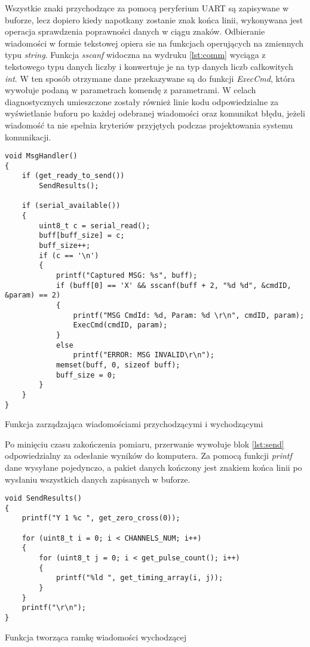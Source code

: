 Wszystkie znaki przychodzące za pomocą peryferium UART są zapisywane w buforze, lecz dopiero kiedy napotkany zostanie znak końca linii, 
wykonywana jest operacja sprawdzenia poprawności danych w ciągu znaków. 
Odbieranie wiadomości w formie tekstowej opiera sie na funkcjach operujących na zmiennych typu \textit{string}. 
Funkcja \textit{sscanf} widoczna na wydruku \ref{lst:comm}  wyciąga z tekstowego typu danych liczby i konwertuje je na typ danych liczb całkowitych \textit{int}.
W ten sposób otrzymane dane przekazywane są do funkcji \textit{ExecCmd}, która wywołuje podaną w parametrach komendę z parametrami.
W celach diagnostycznych umieszczone zostały również linie kodu odpowiedzialne za wyświetlanie buforu po każdej odebranej wiadomości oraz komunikat błędu, 
jeżeli wiadomość ta nie spełnia kryteriów przyjętych podczas projektowania systemu komunikacji.

\begin{listing}[tp]
    \begin{verbatim}
void MsgHandler()
{
    if (get_ready_to_send())
        SendResults();

    if (serial_available())
    {
        uint8_t c = serial_read();
        buff[buff_size] = c;
        buff_size++;
        if (c == '\n')
        {
            printf("Captured MSG: %s", buff);
            if (buff[0] == 'X' && sscanf(buff + 2, "%d %d", &cmdID, &param) == 2)
            {
                printf("MSG CmdId: %d, Param: %d \r\n", cmdID, param);
                ExecCmd(cmdID, param);
            }
            else
                printf("ERROR: MSG INVALID\r\n");
            memset(buff, 0, sizeof buff);
            buff_size = 0;
        }
    }
}
    \end{verbatim}
\caption{Funkcja zarządzająca wiadomościami przychodzącymi i wychodzącymi}
\label{lst:comm}
\end{listing}


Po minięciu czasu zakończenia pomiaru, przerwanie wywołuje blok \ref{lst:send} odpowiedzialny za odesłanie wyników do komputera. Za pomocą funkcji \textit{printf}
dane wysyłane pojedynczo, a pakiet danych kończony jest znakiem końca linii po wysłaniu wszystkich danych zapisanych w buforze.

\begin{listing}[tp]
    \begin{verbatim}
void SendResults()
{
    printf("Y 1 %c ", get_zero_cross(0));

    for (uint8_t i = 0; i < CHANNELS_NUM; i++)
    {
        for (uint8_t j = 0; i < get_pulse_count(); i++)
        {
            printf("%ld ", get_timing_array(i, j));
        }
    }
    printf("\r\n");
}
    \end{verbatim}
\caption{Funkcja tworząca ramkę wiadomości wychodzącej}
\label{lst:send}
\end{listing}

